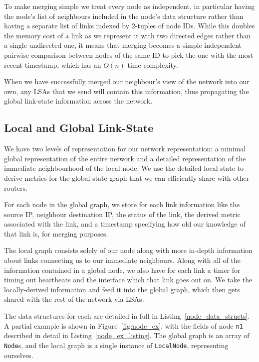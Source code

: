 \documentclass[withindex,glossary,openany]{cam-thesis}
\begin{document}
To make merging simple we treat every node as independent, in particular having the node's list of neighbours included in the node's data structure rather than having a separate list of links indexed by 2-tuples of node IDs. While this doubles the memory cost of a link as we represent it with two directed edges rather than a single undirected one, it means that merging becomes a simple independent pairwise comparison between nodes of the same ID to pick the one with the most recent timestamp, which has an $O(n)$ time complexity.

When we have successfully merged our neighbour's view of the network into our own, any LSAs that we send will contain this information, thus propagating the global link-state information across the network.

\subsection{Local and Global Link-State}

We have two levels of representation for our network representation: a minimal global representation of the entire network and a detailed representation of the immediate neighbourhood of the local node. We use the detailed local state to derive metrics for the global state graph that we can efficiently share with other routers.

For each node in the global graph, we store for each link information like the source IP, neighbour destination IP, the status of the link, the derived metric associated with the link, and a timestamp specifying how old our knowledge of that link is, for merging purposes.

The local graph consists solely of our node along with more in-depth information about links connecting us to our immediate neighbours. Along with all of the information contained in a global node, we also have for each link a timer for timing out heartbeats and the interface which that link goes out on. We take the locally-derived information and feed it into the global graph, which then gets shared with the rest of the network via LSAs.

The data structures for each are detailed in full in Listing~\ref{node_data_structs}. A partial example is shown in Figure~\ref{fig:node_ex}, with the fields of node \texttt{n1} described in detail in Listing~\ref{node_ex_listing}. The global graph is an array of \texttt{Node}s, and the local graph is a single instance of \texttt{LocalNode}, representing ourselves.
\end{document}
